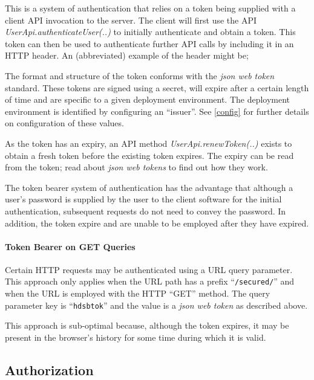 This is a system of authentication that relies on a token being supplied with a client API invocation to the server.  The client will first use the API {\it UserApi.authenticateUser(..)} to initially authenticate and obtain a token.  This token can then be used to authenticate further API calls by including it in an HTTP header.  An (abbreviated) example of the header might be;


The format and structure of the token conforms with the {\it json web token} standard.  These tokens are signed using a secret, will expire after a certain length of time and are specific to a given deployment environment.  The deployment environment is identified by configuring an ``issuer''.  See \ref{config} for further details on configuration of these values.

As the token has an expiry, an API method {\it UserApi.renewToken(..)} exists to obtain a fresh token before the existing token expires.  The expiry can be read from the token; read about {\it json web tokens} to find out how they work.

The token bearer system of authentication has the advantage that although a user's password is supplied by the user to the client software for the initial authentication, subsequent requests do not need to convey the password.  In addition, the token expire and are unable to be employed after they have expired.

\paragraph{Token Bearer on GET Queries}

Certain HTTP requests may be authenticated using a URL query parameter.  This approach only applies when the URL path has a prefix ``{\tt /secured/}'' and when the URL is employed with the HTTP ``GET'' method.  The query parameter key is ``{\tt hdsbtok}'' and the value is a {\it json web token} as described above.

This approach is sub-optimal because, although the token expires, it may be present in the browser's history for some time during which it is valid.

\subsection{Authorization}

